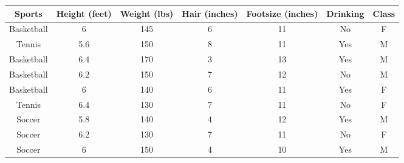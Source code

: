 \documentclass[11pt]{article}
\begin{document}
\vspace{.4cm}
{
\centering
\begin{tabular}{|c|c|c|c|c|c|c|}
	\hline
	Sports& Height (feet) & Weight (lbs)& Hair (inches) & Footsize (inches)& Drinking & Class\\
	\hline
	Basketball&  6& 145 & 6 & 11& No& F\\
	\hline
	Tennis& 5.6 & 150 &  8& 11& Yes&M\\
	\hline
	Basketball& 6.4 & 170 &  3& 13& Yes&M\\
	\hline
	Basketball &6.2  &150  & 7 & 12& No&M\\
	\hline
	Basketball&6 & 140 & 6 & 11& Yes& F\\
	\hline
	Tennis& 6.4 &130  &7  &11& No &F\\
	\hline
	Soccer&  5.8& 140 &4  &  12& Yes&M\\
	\hline
	Soccer& 6.2 &130  &7  &11& No &F\\
	\hline
	Soccer&  6& 150 &4  &  10& Yes&M\\
	\hline
\end{tabular}\par
}
%
\end{document}

